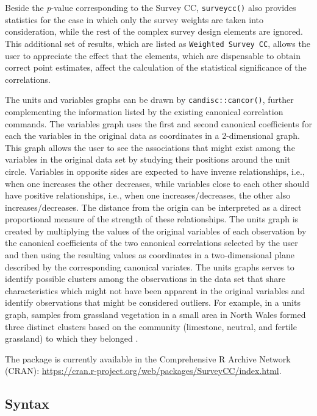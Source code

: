 Beside the \emph{p}-value corresponding to the Survey CC, \texttt{surveycc()} also provides statistics for the case in which only the survey weights are taken into consideration, while the rest of the complex survey design elements are ignored. This additional set of results, which are listed as \texttt{Weighted\ Survey\ CC}, allows the user to appreciate the effect that the elements, which are dispensable to obtain correct point estimates, affect the calculation of the statistical significance of the correlations.

The units and variables graphs \citep{git2012} can be drawn by \texttt{candisc::cancor()}, further complementing the information listed by the existing canonical correlation commands. The variables graph uses the first and second canonical coefficients for each the variables in the original data as coordinates in a 2-dimensional graph. This graph allows the user to see the associations that might exist among the variables in the original data set by studying their positions around the unit circle. Variables in opposite sides are expected to have inverse relationships, i.e., when one increases the other decreases, while variables close to each other should have positive relationships, i.e., when one increases/decreases, the other also increases/decreases. The distance from the origin can be interpreted as a direct proportional measure of the strength of these relationships. The units graph is created by multiplying the values of the original variables of each observation by the canonical coefficients of the two canonical correlations selected by the user and then using the resulting values as coordinates in a two-dimensional plane described by the corresponding canonical variates. The units graphs serves to identify possible clusters among the observations in the data set that share characteristics which might not have been apparent in the original variables \citep{cruz2014} and identify observations that might be considered outliers. For example, in a units graph, samples from grassland vegetation in a small area in North Wales formed three distinct clusters based on the community (limestone, neutral, and fertile grassland) to which they belonged \citep{git2012}.

The  package is currently available in the Comprehensive R Archive Network (CRAN): \url{https://cran.r-project.org/web/packages/SurveyCC/index.html}.

\hypertarget{syntax}{%
\subsection{Syntax}\label{syntax}}

